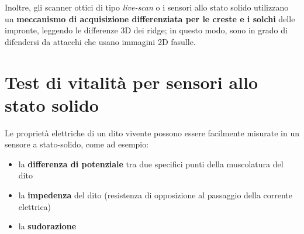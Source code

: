 \documentclass{report}
\begin{document}
\noindent Inoltre, gli scanner ottici di tipo \textit{live-scan} o i sensori allo stato solido 
utilizzano un \textbf{meccanismo di acquisizione differenziata per le creste e i solchi} delle impronte, 
leggendo le differenze 3D dei ridge; in questo modo, sono in grado di difendersi
da attacchi che usano immagini 2D fasulle.

\section{Test di vitalità per sensori allo stato solido}
Le proprietà elettriche di un dito vivente possono essere facilmente 
misurate in un sensore a stato-solido, come ad esempio:
\begin{itemize}
    \item la \textbf{differenza di potenziale} tra due specifici punti della muscolatura del dito
    \item la \textbf{impedenza} del dito (resistenza di opposizione al passaggio della corrente elettrica)
    \item la \textbf{sudorazione}
\end{itemize}
\end{document}
